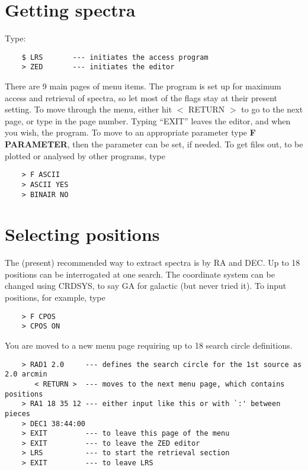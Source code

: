 \section{Getting spectra}

Type:
\begin{verbatim}
    $ LRS       --- initiates the access program
    > ZED       --- initiates the editor
\end{verbatim}
There are 9 main pages of menu items.
The program is set up for maximum access and retrieval of spectra, so let
most of the flags stay at their present setting.
To move through the menu, either hit $<$ RETURN $>$ to go to the next page,
or type in the page number.
Typing ``EXIT'' leaves the editor, and when you wish, the program.
To move to an appropriate parameter type {\bf F PARAMETER}, then the parameter
can be set, if needed.
To get files out, to be plotted or analysed by other programs, type
\begin{verbatim}
    > F ASCII
    > ASCII YES
    > BINAIR NO
\end{verbatim}

\section{Selecting positions}
The (present) recommended way to extract spectra is by RA and DEC.
Up to 18 positions can be interrogated at one search.
The coordinate system can be changed using CRDSYS, to say GA for galactic
(but never tried it).
To input positions, for example, type
\begin{verbatim}
    > F CPOS
    > CPOS ON
\end{verbatim}
You are moved to a new menu page requiring up to 18 search circle definitions.

\begin{verbatim}
    > RAD1 2.0     --- defines the search circle for the 1st source as 2.0 arcmin
       < RETURN >  --- moves to the next menu page, which contains positions
    > RA1 18 35 12 --- either input like this or with `:' between pieces
    > DEC1 38:44:00
    > EXIT         --- to leave this page of the menu
    > EXIT         --- to leave the ZED editor
    > LRS          --- to start the retrieval section
    > EXIT         --- to leave LRS
\end{verbatim}

